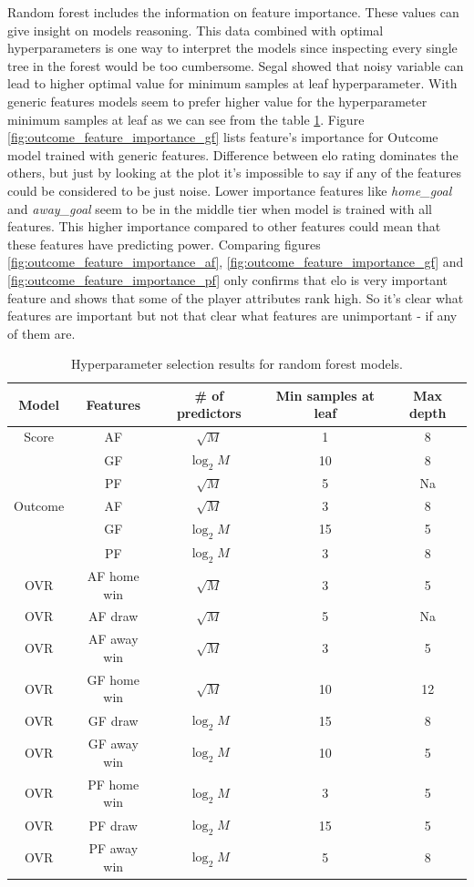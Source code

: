 Random forest includes the information on feature importance. These values can give insight on models reasoning. This data combined with optimal hyperparameters is one way to interpret the models since inspecting every single tree in the forest would be too cumbersome. Segal \cite{segal2004machine} showed that noisy variable can lead to higher optimal value for minimum samples at leaf hyperparameter. With generic features models seem to prefer higher value for the hyperparameter minimum samples at leaf as we can see from the table \ref{table:hyperparam_results}.  Figure \ref{fig:outcome_feature_importance_gf} lists feature's importance for Outcome model trained with generic features. Difference between elo rating dominates the others, but just by looking at the plot it's impossible to say if any of the features could be considered to be just noise. Lower importance features like \textit{home\_goal} and \textit{away\_goal} seem to be in the middle tier when model is trained with all features. This higher importance compared to other features could mean that these features have predicting power. Comparing figures \ref{fig:outcome_feature_importance_af}, \ref{fig:outcome_feature_importance_gf} and \ref{fig:outcome_feature_importance_pf} only confirms that elo is very important feature and shows that some of the player attributes rank high. So it's clear what features are important but not that clear what features are unimportant - if any of them are.

\begin{table}
    \caption{Hyperparameter selection results for random forest models.}
    \begin{tabular}{| c  c| c| c| c|}
        \hline
        Model & Features & \# of predictors & Min samples at leaf & Max depth\\
        \hline
        Score & AF & $\sqrt{M}$ & 1 & 8 \\
         & GF & $\log_2{M}$ & 10 & 8 \\
         & PF & $\sqrt{M}$ & 5 & Na \\
         \hline
        Outcome & AF & $\sqrt{M}$ & 3 & 8 \\
         & GF & $\log_2{M}$ & 15 & 5 \\
         & PF & $\log_2{M}$ & 3 & 8 \\
        \hline
        OVR & AF home win & $\sqrt{M}$ & 3 & 5 \\
        OVR & AF draw & $\sqrt{M}$ & 5 & Na \\
        OVR & AF away win & $\sqrt{M}$ & 3 & 5 \\
        OVR & GF home win & $\sqrt{M}$ & 10 & 12 \\
        OVR & GF draw & $\log_2{M}$ & 15 & 8 \\
        OVR & GF away win & $\log_2{M}$ & 10 & 5 \\
        OVR & PF home win & $\log_2{M}$ & 3 & 5 \\
        OVR & PF draw & $\log_2{M}$ & 15 & 5 \\
        OVR & PF away win & $\log_2{M}$ & 5 & 8 \\
        \hline
    \end{tabular}
    \label{table:hyperparam_results}
\end{table}

